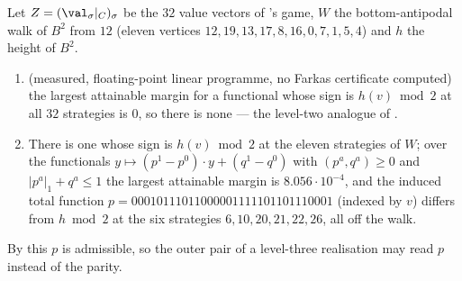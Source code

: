 \begin{proposition}\label{b3:parity-readable}
Let $Z=(\val_\sigma|_{C})_{\sigma}$ be the $32$ value vectors of
's game, $W$ the bottom-antipodal walk of $B^{2}$ from
$12$ (eleven vertices $12,19,13,17,8,16,0,7,1,5,4$) and $h$ the height of
$B^{2}$.
\begin{enumerate}[label=(\alph*),leftmargin=2.2em]
\item (measured, floating-point linear programme, no Farkas certificate
      computed) the largest attainable margin for a functional whose sign is
      $h(v)\bmod2$ at all $32$ strategies is $0$, so there is none --- the
      level-two analogue of .
\item There is one whose sign is $h(v)\bmod2$ at the eleven strategies of $W$;
      over the functionals $y\mapsto(p^{1}-p^{0})\cdot y+(q^{1}-q^{0})$ with
      $(p^{a},q^{a})\ge0$ and $|p^{a}|_1+q^{a}\le1$ the largest attainable
      margin is $8.056\cdot10^{-4}$, and the induced total function
      $p=00010111011000001111101101110001$ (indexed by $v$) differs from
      $h\bmod2$ at the six strategies $6,10,20,21,22,26$, all off the walk.
\end{enumerate}
By  this $p$ is admissible, so the outer pair of a
level-three realisation may read $p$ instead of the parity.
\end{proposition}

